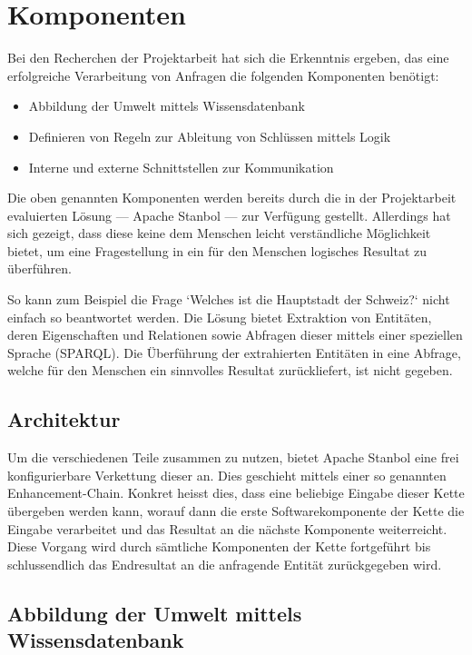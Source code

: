 \chapter{Komponenten}
\label{chap:komponenten}

Bei den Recherchen der Projektarbeit hat sich die Erkenntnis ergeben, das eine erfolgreiche Verarbeitung von Anfragen die folgenden Komponenten benötigt:
\begin{itemize}
	\item Abbildung der Umwelt mittels Wissensdatenbank
	\item Definieren von Regeln zur Ableitung von Schlüssen mittels Logik
	\item Interne und externe Schnittstellen zur Kommunikation
\end{itemize}

Die oben genannten Komponenten werden bereits durch die in der Projektarbeit evaluierten Lösung --- Apache Stanbol --- zur Verfügung gestellt. Allerdings hat sich gezeigt, dass diese keine dem Menschen leicht verständliche Möglichkeit bietet, um eine Fragestellung  in ein für den Menschen logisches Resultat zu überführen.

So kann zum Beispiel die Frage `Welches ist die Hauptstadt der Schweiz?` nicht einfach so beantwortet werden. Die Lösung bietet Extraktion von Entitäten, deren Eigenschaften und Relationen sowie Abfragen dieser mittels einer speziellen Sprache (SPARQL). Die Überführung der extrahierten Entitäten in eine Abfrage, welche für den Menschen ein sinnvolles Resultat zurückliefert, ist nicht gegeben.

\section{Architektur}
\label{sec:architektur}
Um die verschiedenen Teile zusammen zu nutzen, bietet Apache Stanbol eine frei konfigurierbare Verkettung dieser an. Dies geschieht mittels einer so genannten Enhancement-Chain. Konkret heisst dies, dass eine beliebige Eingabe dieser Kette übergeben werden kann, worauf dann die erste Softwarekomponente der Kette die Eingabe verarbeitet und das Resultat an die nächste Komponente weiterreicht. Diese Vorgang wird durch sämtliche Komponenten der Kette fortgeführt bis schlussendlich das Endresultat an die anfragende Entität zurückgegeben wird.

\section{Abbildung der Umwelt mittels Wissensdatenbank}
\label{sec:architektur_wissensdatenbank}

